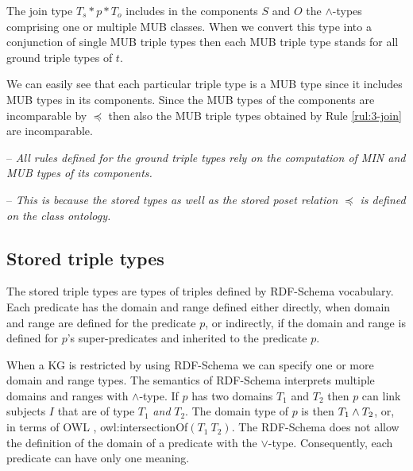 \documentclass[runningheads]{llncs}
\newcommand{\memo}[1]{}
\newcommand{\notes}[1]{\noindent\begin{small}-- \emph{#1}\hfill\break\end{small}}
\begin{document}
The join type $T_s*p*T_o$ includes in the components $S$ and $O$ the
$\land$-types comprising one or multiple MUB classes. When we convert
this type into a conjunction of single MUB triple types then each MUB
triple type stands for all ground triple types of $t$.

We can easily see that each particular triple type is a MUB type since
it includes MUB types in its components. Since the MUB types of the
components are incomparable by $\preceq$ then also the MUB triple
types obtained by Rule \ref{rul:3-join} are incomparable.

\notes{All rules defined for the ground triple types rely on the computation of MIN and MUB types of its components.}
\notes{This is because the stored types as well as the stored poset relation $\preceq$ is defined on the class ontology.}

\memo{The types of $s$ and $o$ can be any classes $T_s$ and $T_o$ from
  ${\cal I}_c$, while the type of $p$ has to be a class $T_p$ that is
  a subclass of rdf:Property. The typing of a triple $t$ is correct
  since the interpretation of $T$ includes $t$.}

\memo{Moreover, the types $T$ that are derived by the above rule are
  minimal in the sense that given the information provided, i.e., the
  types of $t$'s components, their interpretations are minimal
  possible comparing them to the interpretations of all other derived
  types of $t$.}






\subsection{Stored triple types\label{sec:stored-3types}}

The stored triple types are types of triples defined by RDF-Schema
\cite{rdfschema} vocabulary. Each predicate has the domain and range
defined either directly, when domain and range are defined for the
predicate $p$, or indirectly, if the domain and range is defined for
$p$'s super-predicates and inherited to the predicate $p$.

When a KG is restricted by using RDF-Schema we can specify one or more
domain and range types. The semantics of RDF-Schema
\cite{rdfsemantics} interprets multiple domains and ranges with
$\land$-type. If $p$ has two domains $T_1$ and $T_2$ then $p$ can link
subjects $I$ that are of type $T_1$ \emph{and} $T_2$. The domain type
of $p$ is then $T_1\land\/T_2$, or, in terms of OWL \cite{owl},
owl:intersectionOf$(T_1\ T_2)$. The RDF-Schema does not allow the
definition of the domain of a predicate with the
$\lor$-type. Consequently, each predicate can have only one meaning.
  
\end{document}
